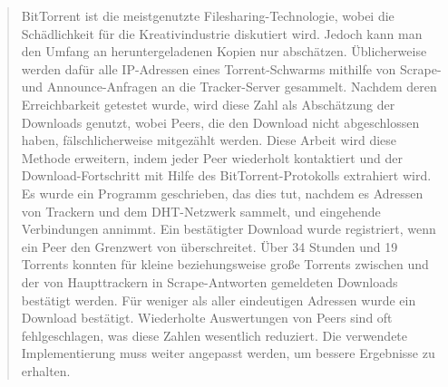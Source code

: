 \documentclass[10pt, a4paper, twoside=false, headsepline]{scrbook}
\renewcommand{\_}{\origunderscore\allowbreak}
\begin{document}
\begin{quote}
BitTorrent ist die meistgenutzte Filesharing-Technologie, wobei die Schädlichkeit für die Kreativindustrie diskutiert wird. Jedoch kann man den Umfang an heruntergeladenen Kopien nur abschätzen.
Üblicherweise werden dafür alle IP-Adressen eines Torrent-Schwarms mithilfe von Scrape- und Announce-Anfragen an die Tracker-Server gesammelt. Nachdem deren Erreichbarkeit getestet wurde, wird diese Zahl als Abschätzung der Downloads genutzt, wobei Peers, die den Download nicht abgeschlossen haben, fälschlicherweise mitgezählt werden.
Diese Arbeit wird diese Methode erweitern, indem jeder Peer wiederholt kontaktiert und der Download-Fortschritt mit Hilfe des BitTorrent-Protokolls extrahiert wird. Es wurde ein Programm geschrieben, das dies tut, nachdem es Adressen von Trackern und dem DHT-Netzwerk sammelt, und eingehende Verbindungen annimmt. Ein bestätigter Download wurde registriert, wenn ein Peer den Grenzwert von  überschreitet.
Über 34 Stunden und 19 Torrents konnten für kleine beziehungsweise große Torrents zwischen  und  der von Haupttrackern in Scrape-Antworten gemeldeten Downloads bestätigt werden. Für weniger als  aller eindeutigen Adressen wurde ein Download bestätigt.
Wiederholte Auswertungen von Peers sind oft fehlgeschlagen, was diese Zahlen wesentlich reduziert. Die verwendete Implementierung muss weiter angepasst werden, um bessere Ergebnisse zu erhalten.
\end{quote}
\vspace*{\fill}

\begin{onehalfspacing}
\tableofcontents

\listoffigures

\listoftables
\end{onehalfspacing}

\end{document}
